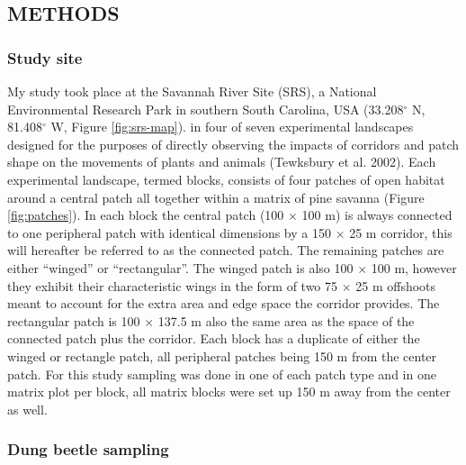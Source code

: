 \documentclass[
  man, donotrepeattitle]{apa6}
\begin{document}
\subsection{METHODS}\label{methods}

\subsubsection{Study site}\label{study-site}

My study took place at the Savannah River Site (SRS), a National Environmental Research Park in southern South Carolina, USA (33.208\(^\circ\) N, 81.408\(^\circ\) W, Figure \ref{fig:srs-map}). in four of seven experimental landscapes designed for the purposes of directly observing the impacts of corridors and patch shape on the movements of plants and animals (Tewksbury et al. 2002). Each experimental landscape, termed blocks, consists of four patches of open habitat around a central patch all together within a matrix of pine savanna (Figure \ref{fig:patches}). In each block the central patch (100 \(\times\) 100 m) is always connected to one peripheral patch with identical dimensions by a 150 \(\times\) 25 m corridor, this will hereafter be referred to as the connected patch. The remaining patches are either ``winged'' or ``rectangular''. The winged patch is also 100 \(\times\) 100 m, however they exhibit their characteristic wings in the form of two 75 \(\times\) 25 m offshoots meant to account for the extra area and edge space the corridor provides. The rectangular patch is 100 \(\times\) 137.5 m also the same area as the space of the connected patch plus the corridor. Each block has a duplicate of either the winged or rectangle patch, all peripheral patches being 150 m from the center patch. For this study sampling was done in one of each patch type and in one matrix plot per block, all matrix blocks were set up 150 m away from the center as well.

\subsubsection{Dung beetle sampling}\label{dung-beetle-sampling}
\end{document}
